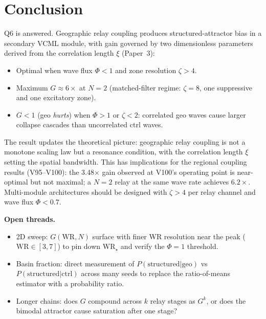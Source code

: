 \documentclass[11pt]{article}
\begin{document}
\section{Conclusion}

Q6 is answered. Geographic relay coupling produces structured-attractor bias in a
secondary VCML module, with gain governed by two dimensionless parameters derived from
the correlation length $\xi$ (Paper~3):
\begin{itemize}
  \item Optimal when wave flux $\Phi < 1$ and zone resolution $\zeta > 4$.
  \item Maximum $G \approx 6\times$ at $N=2$ (matched-filter regime: $\zeta = 8$, one
    suppressive and one excitatory zone).
  \item $G < 1$ (geo \emph{hurts}) when $\Phi > 1$ or $\zeta < 2$: correlated geo waves
    cause larger collapse cascades than uncorrelated ctrl waves.
\end{itemize}

The result updates the theoretical picture: geographic relay coupling is not a monotone
scaling law but a resonance condition, with the correlation length $\xi$ setting the
spatial bandwidth. This has implications for the regional coupling results (V95--V100):
the 3.48$\times$ gain observed at V100's operating point is near-optimal but not maximal;
a $N=2$ relay at the same wave rate achieves $6.2\times$. Multi-module architectures
should be designed with $\zeta > 4$ per relay channel and wave flux $\Phi < 0.7$.

\bigskip
\noindent\textbf{Open threads.}
\begin{itemize}
  \item 2D sweep: $G(\mathrm{WR}, N)$ surface with finer WR resolution near the peak
    ($\mathrm{WR} \in [3, 7]$) to pin down $\mathrm{WR}_\star$ and verify the $\Phi = 1$
    threshold.
  \item Basin fraction: direct measurement of $P(\mathrm{structured} | \mathrm{geo})$ vs
    $P(\mathrm{structured} | \mathrm{ctrl})$ across many seeds to replace the
    ratio-of-means estimator with a probability ratio.
  \item Longer chains: does $G$ compound across $k$ relay stages as $G^k$, or does the
    bimodal attractor cause saturation after one stage?
\end{itemize}
\end{document}
